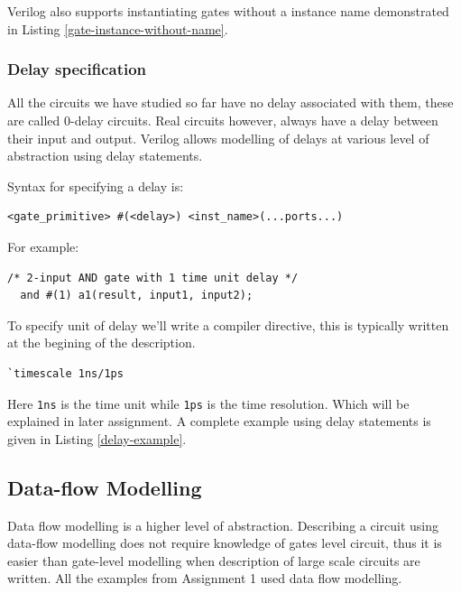 \documentclass[a4paper,10pt]{article}
\theoremstyle{mytheor}
\newcommand{
  \insertverilog}[3]{
  
}
\begin{document}
\insertverilog{./verilog_files/gateLevelExample.v}{gate-level-impl}{\text{Example module using Gate-level modelling}}

Verilog also supports instantiating gates without a instance name demonstrated in Listing \ref{gate-instance-without-name}.
\insertverilog{./verilog_files/unnamedGate.v}{gate-instance-without-name}{\text{Instantiating unnamed gates}}

\subsubsection*{Delay specification}
All the circuits we have studied so far have no delay associated with them, these are called 0-delay circuits. Real circuits however, always have a delay between their input and output. Verilog allows modelling of delays at various level of abstraction using delay statements.

Syntax for specifying a delay is:
\begin{lstlisting}[style=verilog-inline-style, xleftmargin=0.2\textwidth]
  <gate_primitive> #(<delay>) <inst_name>(...ports...) 
\end{lstlisting}

For example:
\begin{lstlisting}[style=verilog-inline-style, xleftmargin=0.25\textwidth]
  /* 2-input AND gate with 1 time unit delay */
  and #(1) a1(result, input1, input2);
\end{lstlisting}

\vspace{0.1cm}
To specify unit of delay we'll write a compiler directive, this is typically written at the begining of the description.
\begin{center}
  \begin{lstlisting}[style=verilog-inline-style,xleftmargin=.35\textwidth]
    `timescale 1ns/1ps
  \end{lstlisting}
\end{center}


Here \lstinline[upquote=true]{1ns} is the time unit while \lstinline[upquote=true]{1ps} is the time resolution. Which will be explained in later assignment. A complete example using delay statements is given in Listing \ref{delay-example}.

\insertverilog{./verilog_files/delayExample.v}{delay-example}{\text{Example usage of delays statement to specify propagation delay of logic gates.}}


\subsection*{Data-flow Modelling}
Data flow modelling is a higher level of abstraction. Describing a circuit using data-flow modelling does not require knowledge of gates level circuit, thus it is easier than gate-level modelling when description of large scale circuits are written.  All the examples from Assignment 1 used data flow modelling.
\end{document}
